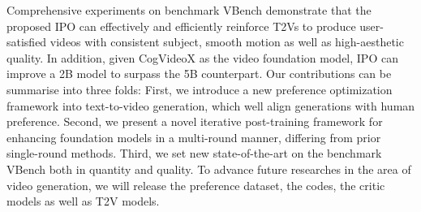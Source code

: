 Comprehensive experiments on benchmark VBench demonstrate that the proposed IPO can effectively and efficiently reinforce T2Vs to produce user-satisfied videos with consistent subject, smooth motion as well as high-aesthetic quality. In addition, given CogVideoX as the video foundation model, IPO can improve a 2B model to surpass the 5B counterpart. Our contributions can be summarise into three folds: First, we introduce a new preference optimization framework into text-to-video generation, which well align generations with human preference. Second, we present a novel iterative post-training framework for enhancing foundation models in a multi-round manner, differing from prior single-round methods. Third, we set new state-of-the-art on the benchmark VBench both in quantity and quality. To advance future researches in the area of video generation, we will release the preference dataset, the codes, the critic models as well as T2V models.




